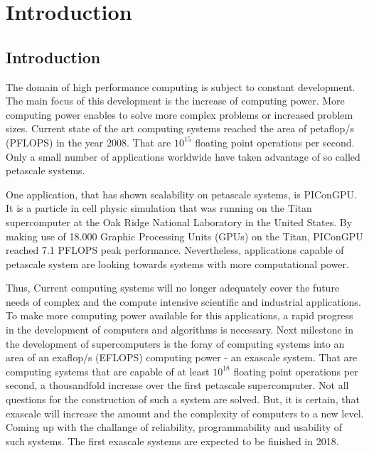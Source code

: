 \chapter{Introduction}
\label{sec:intro}




\section{Introduction}

The domain of high performance computing is subject to constant
development.  The main focus of this development is the increase of
computing power.  More computing power enables to solve more complex
problems or increased problem sizes.  Current state of the art
computing systems reached the area of petaflop/s (PFLOPS) in the year
2008. That are $10^{15}$ floating point operations per second.  Only a
small number of applications worldwide have taken advantage of so
called petascale systems.

One application, that has shown scalability on petascale systems, is
PIConGPU. It is a particle in cell physic simulation that was running
on the Titan supercomputer at the Oak Ridge National Laboratory in the
United States. By making use of 18.000 Graphic Processing Units (GPUs)
on the Titan, PIConGPU reached 7.1 PFLOPS peak performance.
Nevertheless, applications capable of petascale system are looking
towards systems with more computational power.

Thus, Current computing systems will no longer adequately cover the
future needs of complex and the compute intensive scientific and
industrial applications.  To make more computing power available for
this applications, a rapid progress in the development of computers
and algorithms is necessary.  Next milestone in the development of
supercomputers is the foray of computing systems into an area of an
exaflop/s (EFLOPS) computing power - an exascale system. That are
computing systems that are capable of at least $10^{18}$ floating
point operations per second, a thousandfold increase over the first
petascale supercomputer.  Not all questions for the construction of
such a system are solved. But, it is certain, that exascale will
increase the amount and the complexity of computers to a new
level. Coming up with the challange of reliability, programmability
and usability of such systems. The first exascale systems are expected
to be finished in 2018.


